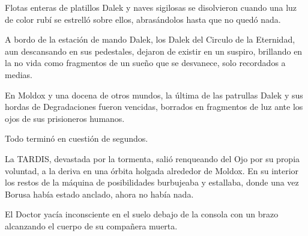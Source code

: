 Flotas enteras de platillos Dalek y naves sigilosas se disolvieron cuando una luz de color rubí se estrelló sobre ellos, abrasándolos hasta que no quedó nada.

A bordo de la estación de mando Dalek, los Dalek del Circulo de la Eternidad, aun descansando en sus pedestales, dejaron de existir en un suspiro, brillando en la no vida como fragmentos de un sueño que se desvanece, solo recordados a medias.

En Moldox y una docena de otros mundos, la última de las patrullas Dalek y sus hordas de Degradaciones fueron vencidas, borrados en fragmentos de luz ante los ojos de sus prisioneros humanos.

Todo terminó en cuestión de segundos.

La TARDIS, devastada por la tormenta, salió renqueando del Ojo por su propia voluntad, a la deriva en una órbita holgada alrededor de Moldox. En su interior los restos de la máquina de posibilidades burbujeaba y estallaba, donde una vez Borusa había estado anclado, ahora no había nada.

El Doctor yacía inconsciente en el suelo debajo de la consola con un brazo alcanzando el cuerpo de su compañera muerta.
